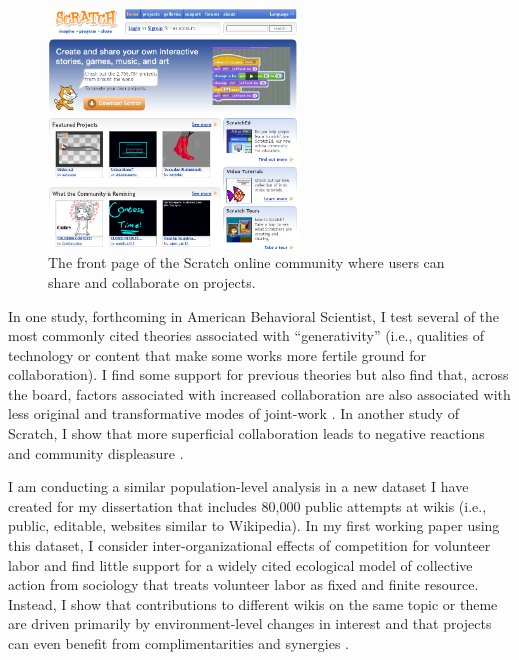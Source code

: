 \documentclass[10pt]{memoir}
\begin{document}
\begin{figure}
 \begin{centering}
 \includegraphics[width=2.6in]{figures/frontpage_modified-topremix.png}
  \caption{The front page of the Scratch online community where users
    can share and collaborate on projects.}
 \label{fig:scratchfrontpage}
 \end{centering}
 \vspace{-2em}
\end{figure}

In one study, forthcoming in American Behavioral Scientist, I test
several of the most commonly cited theories associated with
``generativity'' (i.e., qualities of technology or content that make
some works more fertile ground for collaboration). I find some support
for previous theories but also find that, across the board, factors
associated with increased collaboration are also associated with less
original and transformative modes of joint-work
\cite{hill_remixing_2012}. In another study of Scratch, I show that
more superficial collaboration leads to negative reactions and
community displeasure \cite{hill_responses_2010}.

I am conducting a similar population-level analysis in a new dataset I
have created for my dissertation that includes 80,000 public attempts
at wikis (i.e., public, editable, websites similar to Wikipedia). In
my first working paper using this dataset, I consider
inter-organizational effects of competition for volunteer labor and
find little support for a widely cited ecological model of collective
action from sociology that treats volunteer labor as fixed and finite
resource. Instead, I show that contributions to different wikis on the
same topic or theme are driven primarily by environment-level changes
in interest and that projects can even benefit from complimentarities
and synergies \cite{hill_is_2012}.
\end{document}
